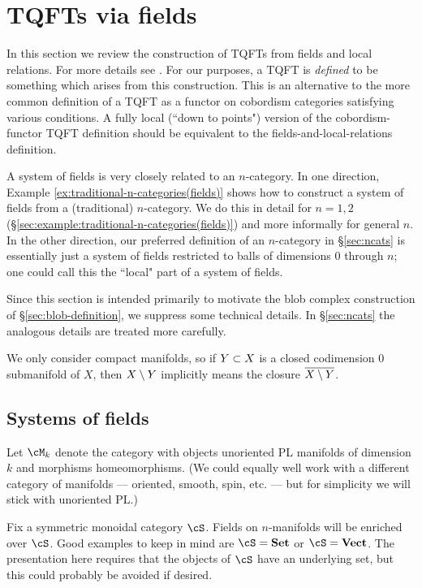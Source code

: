 
\section{TQFTs via fields}
\label{sec:fields}
\label{sec:tqftsviafields}

In this section we review the construction of TQFTs from fields and local relations.
For more details see \cite{kw:tqft}.
For our purposes, a TQFT is {\it defined} to be something which arises
from this construction.
This is an alternative to the more common definition of a TQFT
as a functor on cobordism categories satisfying various conditions.
A fully local (``down to points") version of the cobordism-functor TQFT definition
should be equivalent to the fields-and-local-relations definition.

A system of fields is very closely related to an $n$-category.
In one direction, Example \ref{ex:traditional-n-categories(fields)}
shows how to construct a system of fields from a (traditional) $n$-category.
We do this in detail for $n=1,2$ (\S\ref{sec:example:traditional-n-categories(fields)}) 
and more informally for general $n$.
In the other direction, 
our preferred definition of an $n$-category in \S\ref{sec:ncats} is essentially
just a system of fields restricted to balls of dimensions 0 through $n$;
one could call this the ``local" part of a system of fields.

Since this section is intended primarily to motivate
the blob complex construction of \S\ref{sec:blob-definition}, 
we suppress some technical details.
In \S\ref{sec:ncats} the analogous details are treated more carefully.

\medskip

We only consider compact manifolds, so if $Y \subset X$ is a closed codimension 0
submanifold of $X$, then $X \setminus Y$ implicitly means the closure
$\overline{X \setminus Y}$.


\subsection{Systems of fields}
\label{ss:syst-o-fields}

Let $\cM_k$ denote the category with objects 
unoriented PL manifolds of dimension
$k$ and morphisms homeomorphisms.
(We could equally well work with a different category of manifolds ---
oriented, smooth, spin, etc. --- but for simplicity we
will stick with unoriented PL.)

Fix a symmetric monoidal category $\cS$.
Fields on $n$-manifolds will be enriched over $\cS$.
Good examples to keep in mind are $\cS = \Set$ or $\cS = \Vect$.
The presentation here requires that the objects of $\cS$ have an underlying set, 
but this could probably be avoided if desired.


